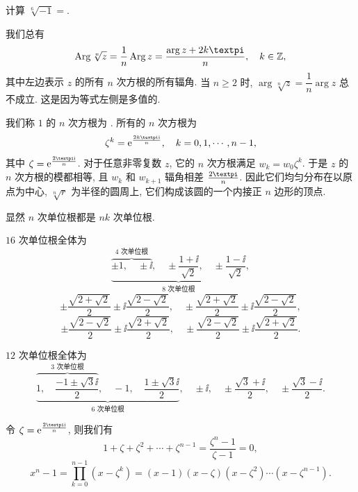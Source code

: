 \begin{exercise}
  计算 $\sqrt[6]{-1}=$\fillblank[9em]{}.
\end{exercise}

我们总有
\begin{equation}
  \label{eq:Arg-root-equality}
  \Arg \sqrt[n]z=\frac1n\Arg z=\frac{\arg z+2k\cpi}n,\quad k\in\BZ,
\end{equation}
其中左边表示 $z$ 的所有 $n$ 次方根的所有辐角.
  \alert{当 $n\ge 2$ 时, $\arg \sqrt[n]z=\dfrac 1n\arg z$ 总不成立.} 
这是因为等式左侧是多值的.

我们称 $1$ 的 $n$ 次方根为 .
所有的 $n$ 次方根为
\[
  \zeta^k=\ee^{\frac{2k\cpi \ii}n},\quad k=0,1,\cdots,n-1,
\]
其中 $\zeta=\ee^{\frac{2\cpi \ii}n}$.
对于任意非零复数 $z$, 它的 $n$ 次方根满足 $w_k=w_0\zeta^k$.
于是 $z$ 的 $n$ 次方根的模都相等, 且 $w_k$ 和 $w_{k+1}$ 辐角相差 $\frac{2\cpi}n$.
因此\alert{它们均匀分布在以原点为中心, $\sqrt[n]r$ 为半径的圆周上}, 它们构成该圆的一个内接正 $n$ 边形的顶点.

\begin{example}
  显然 $n$ 次单位根都是 $nk$ 次单位根.
  \begin{enumr}
    \item $16$ 次单位根全体为
    \[
      \underbrace{
        \overbrace{
          \pm1,\quad
          \pm \ii
        }^{\text{$4$ 次单位根}},\quad
        \pm\frac{1+\ii}{\sqrt2},\quad
        \pm\frac{1-\ii}{\sqrt2}
      }_{\text{$8$ 次单位根}},
    \]
    \[
      \pm\frac{\sqrt{2+\sqrt2}}2\pm\ii\frac{\sqrt{2-\sqrt2}}2,\quad
      \pm\frac{\sqrt{2+\sqrt2}}2\pm\ii\frac{\sqrt{2-\sqrt2}}2,
    \]
    \[
      \pm\frac{\sqrt{2-\sqrt2}}2\pm\ii\frac{\sqrt{2+\sqrt2}}2,\quad
      \pm\frac{\sqrt{2-\sqrt2}}2\pm\ii\frac{\sqrt{2+\sqrt2}}2.
    \]
    \vspace{-\baselineskip}
    \item $12$ 次单位根全体为
    \[
      \underbrace{
        \overbrace{
          1,\quad
          \frac{-1\pm\sqrt3\ii}2
        }^{\text{$3$ 次单位根}},\quad
        -1,\quad
        \frac{1\pm\sqrt3\ii}2
      }_{\text{$6$ 次单位根}},\quad
      \pm\ii,\quad
      \pm\frac{\sqrt 3+\ii}2,\quad
      \pm\frac{\sqrt 3-\ii}2.
    \]
    \vspace{-\baselineskip}
    \item 令 $\zeta=\ee^{\frac{2\cpi \ii}n}$, 则我们有
    \[
      1+\zeta+\zeta^2+\cdots+\zeta^{n-1}
      =\frac{\zeta^n-1}{\zeta-1}=0,
    \]
    \[
        x^n-1
      =\prod_{k=0}^{n-1}(x-\zeta^k)
      =(x-1)(x-\zeta)(x-\zeta^2)\cdots(x-\zeta^{n-1}).
    \]
  \end{enumr}
\end{example}


